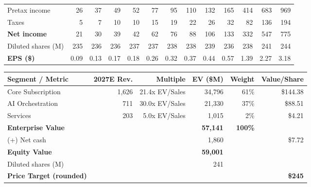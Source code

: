 \documentclass[theme=institutional-research,publication-type=equity-research]{reportkit}
\begin{document}
\begin{fullwidthexhibit}
\begin{exhibit}[
  title={Income statement and key operating metrics},
  source={Company data; ReportKit Research estimates.},
  label={tab:financial-model}
]
\begin{financialmodelpage}
\begin{tabular}{@{}lrrrrrrrrrrrr@{}}
Pretax income & 26&37&49&52&77&95&110&132&165&414&683&969\\
Taxes & 5&7&10&10&15&19&22&26&32&82&136&194\\
\textbf{Net income} & 21&30&39&42&62&76&88&106&133&332&547&775\\
Diluted shares (M) & 235&236&236&237&237&238&238&239&236&238&241&244\\
\textbf{EPS (\$)} & 0.09&0.13&0.17&0.18&0.26&0.32&0.37&0.44&0.57&1.39&2.27&3.18\\
\bottomrule
\end{tabular}
\end{financialmodelpage}
\end{exhibit}
\end{fullwidthexhibit}

\begin{fullwidthexhibit}
\begin{exhibit}[
  title={Sum-of-the-parts valuation supports a \$245 price target},
  source={Company data; ReportKit Research estimates. Figures are fictional and for design demonstration only. Component value-per-share figures sum to \$244.82 (2dp rounding against the unrounded \$244.90) before rounding to the \$245 published target.},
  label={tab:valuation}
]
\begin{financialtable}
\begin{tabularx}{\linewidth}{@{}Yrrrrr@{}}
\toprule
\textbf{Segment / Metric} & \textbf{2027E Rev.} & \textbf{Multiple} & \textbf{EV (\$M)} & \textbf{Weight} & \textbf{Value/Share}\\
\midrule
Core Subscription & 1,626 & 21.4x EV/Sales & 34,796 & 61\% & \$144.38\\
AI Orchestration & 711 & 30.0x EV/Sales & 21,330 & 37\% & \$88.51\\
Services & 203 & 5.0x EV/Sales & 1,015 & 2\% & \$4.21\\
\midrule
\textbf{Enterprise Value} & & & \textbf{57,141} & \textbf{100\%} & \\
(+) Net cash & & & 1,860 & & \$7.72\\
\midrule
\textbf{Equity Value} & & & \textbf{59,001} & & \\
Diluted shares (M) & & & 241 & & \\
\textbf{Price Target (rounded)} & & & & & \textbf{\$245}\\
\bottomrule
\end{tabularx}
\end{financialtable}
\end{exhibit}
\end{fullwidthexhibit}
\end{document}
